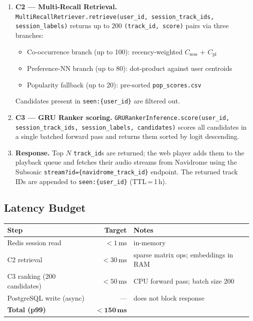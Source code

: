 \documentclass[11pt]{article}
\begin{document}
\begin{enumerate}[leftmargin=1.5em]
  \item \textbf{C2 --- Multi-Recall Retrieval.}
        \texttt{MultiRecallRetriever.retrieve(user\_id, session\_track\_ids, session\_labels)}
        returns up to 200 \texttt{(track\_id, score)} pairs via three branches:
        \begin{itemize}
          \item Co-occurrence branch (up to 100): recency-weighted $C_\text{sess}$ + $C_\text{pl}$
          \item Preference-NN branch (up to 80): dot-product against user centroids
          \item Popularity fallback (up to 20): pre-sorted \texttt{pop\_scores.csv}
        \end{itemize}
        Candidates present in \texttt{seen:\{user\_id\}} are filtered out.

  \item \textbf{C3 --- GRU Ranker scoring.}
        \texttt{GRURankerInference.score(user\_id, session\_track\_ids, session\_labels, candidates)}
        scores all candidates in a single batched forward pass and returns them sorted by
        logit descending.

  \item \textbf{Response.}
        Top $N$ \texttt{track\_id}s are returned; the web player adds them to the playback queue
        and fetches their audio streams from Navidrome using the Subsonic
        \texttt{stream?id=\{navidrome\_track\_id\}} endpoint.
        The returned track IDs are appended to \texttt{seen:\{user\_id\}} (TTL\,=\,1\,h).

\end{enumerate}

\subsection{Latency Budget}

\begin{longtable}{@{}lrl@{}}
\toprule
Step & Target & Notes \\
\midrule
Redis session read & $<1\,\text{ms}$ & in-memory \\
C2 retrieval & $<30\,\text{ms}$ & sparse matrix ops; embeddings in RAM \\
C3 ranking (200 candidates) & $<50\,\text{ms}$ & CPU forward pass; batch size 200 \\
PostgreSQL write (async) & --- & does not block response \\
\midrule
\textbf{Total (p99)} & $\mathbf{<150\,\text{ms}}$ & \\
\bottomrule
\end{longtable}
\end{document}
